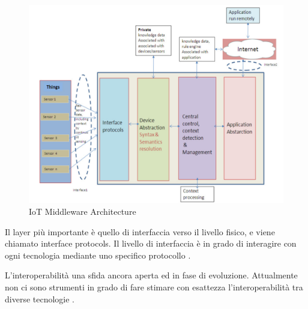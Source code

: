 \documentclass[12pt,a4paper,openright,twoside]{report}
\begin{document}
\begin{figure}[h]                      
\begin{center} 
\includegraphics[width=\textwidth]{IoT_Middleware_Architecture.png}
\caption[IoT Middleware Architecture]{IoT Middleware Architecture}\label{fig:ottava}
\end{center}
\end{figure}
Il layer pi\`u importante \`e quello di interfaccia verso il livello fisico, e viene chiamato  interface protocols. 
Il livello di interfaccia \`e in grado di interagire con ogni tecnologia mediante uno specifico protocollo \cite{K16}. 
			
L'interoperabilit\`a una sfida ancora aperta ed in fase di evoluzione. Attualmente non ci sono strumenti in grado di fare stimare con esattezza l'interoperabilit\`a tra diverse tecnologie \cite{K2}.  
\end{document}
